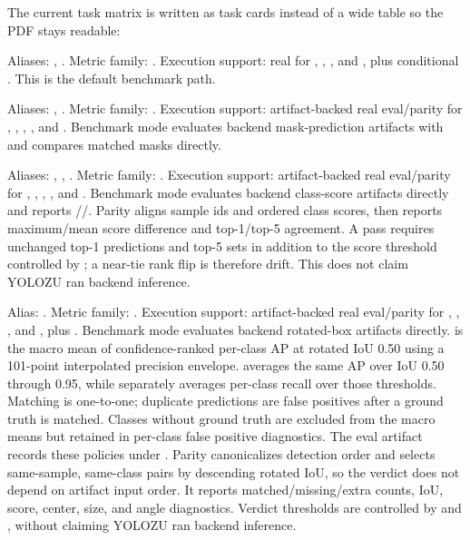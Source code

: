 The current task matrix is written as task cards instead of a wide table so the
PDF stays readable:
\begin{description}[leftmargin=2.8cm, style=nextline]
  \item[\cmd{detect}]
  Aliases: , . Metric family: .
  Execution support: real for , , , and
  , plus conditional . This is the default benchmark path.

  \item[\cmd{segmentation}]
  Aliases: , . Metric family: .
  Execution support: artifact-backed real eval/parity for ,
  , , , and . Benchmark mode evaluates
  backend mask-prediction artifacts with  and
  compares matched masks directly.

  \item[\cmd{classification}]
  Aliases: , , . Metric family:
  . Execution support: artifact-backed real eval/parity for
  , , , , and . Benchmark mode
  evaluates backend class-score artifacts directly and reports
  //. Parity aligns sample ids and ordered
  class scores, then reports maximum/mean score difference and top-1/top-5
  agreement. A pass requires unchanged top-1 predictions and top-5 sets in
  addition to the score threshold controlled by
  ; a near-tie rank flip is therefore
  drift. This does not claim YOLOZU ran backend inference.

  \item[\cmd{obb}]
  Alias: . Metric family: . Execution support:
  artifact-backed real eval/parity for , , , and
  , plus . Benchmark mode evaluates backend
  rotated-box artifacts directly.  is the macro mean of
  confidence-ranked per-class AP at rotated IoU 0.50 using a 101-point
  interpolated precision envelope.  averages the same AP over
  IoU 0.50 through 0.95, while  separately averages per-class
  recall over those thresholds. Matching is one-to-one; duplicate predictions
  are false positives after a ground truth is matched. Classes without ground
  truth are excluded from the macro means but retained in per-class false
  positive diagnostics. The eval artifact records these policies under
  . Parity canonicalizes detection order and
  selects same-sample, same-class pairs by descending rotated IoU, so the
  verdict does not depend on artifact input order. It reports
  matched/missing/extra counts, IoU, score, center, size, and angle diagnostics.
  Verdict thresholds are controlled
  by  and , without
  claiming YOLOZU ran backend inference.


\end{description}

